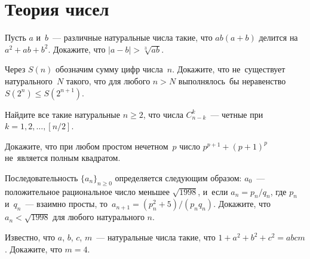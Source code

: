 
\section*{Теория чисел}


\begin{problems}

\item
Пусть $a$ и~$b$~--- различные натуральные числа такие, что $a b (a + b)$
делится на~$a^2 + a b + b^2$.
Докажите, что $|a - b| > \sqrt[3]{ab}$.

\item
Через $S(n)$ обозначим сумму цифр числа~$n$.
Докажите, что не~существует натурального~$N$ такого, что для любого $n > N$
выполнялось~бы неравенство $S(2^n) \leq S(2^{n+1})$.

\item
Найдите все такие натуральные $n \geq 2$, что числа $C_{n-k}^k$~--- четные при
$k = 1, 2, \ldots, [n / 2]$. 

\item
Докажите, что при любом простом нечетном~$p$ число $p^{p+1} + (p + 1)^p$
не~является полным квадратом.


\item
Последовательность $\{a_n\}_{n \geq 0}$ определяется следующим образом:
$a_0$~--- положительное рациональное число меньшее $\sqrt{1998}$, и~если
$a_n = p_n / q_n$, где $p_n$ и~$q_n$~--- взаимно просты,
то~$a_{n+1} = (p_n^2 + 5) / (p_n q_n)$.
Докажите, что $a_n < \sqrt{1998}$ для любого натурального $n$.

\item
Известно, что $a$, $b$, $c$, $m$~--- натуральные числа такие, что
$1 + a^2 + b^2 + c^2 = a b c m$.
Докажите, что $m = 4$.


\end{problems}


